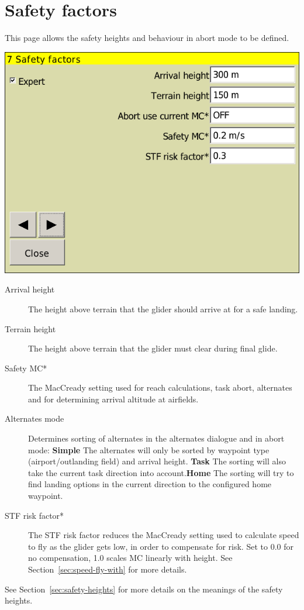 \section{Safety factors}

This page allows the safety heights and behaviour in abort mode to be defined.

\begin{center}
\includegraphics[angle=0,width=0.8\linewidth,keepaspectratio='true']{figures/config-safety.png}
\end{center}

\begin{description}
\item[Arrival height]  The height above terrain that the glider
  should arrive at for a safe landing.
\item[Terrain height] \label{conf:safetyterrain} The height above terrain that the glider must
  clear during final glide.
\item[Safety MC*]  The MacCready setting used for reach calculations, task abort, alternates and
  for determining arrival altitude at airfields. 
\item[Alternates mode]\label{conf:alternatesmode}
Determines sorting of alternates in the alternates dialogue and in abort mode: {\bf Simple} The alternates will only be sorted by waypoint type (airport/outlanding field) and arrival height. {\bf Task} The sorting will also take the current task direction into account.{\bf Home} The sorting will try to find landing options in the current direction to the configured home waypoint.
\item[STF risk factor*] 
  The STF risk factor reduces the MacCready setting used to calculate
  speed to fly as the glider gets low, in order to compensate for
  risk.  Set to 0.0 for no compensation, 1.0 scales MC linearly with
  height.  See Section~\ref{sec:speed-fly-with} for more details.
\end{description}
See Section~\ref{sec:safety-heights} for more details on the meanings
of the safety heights.

